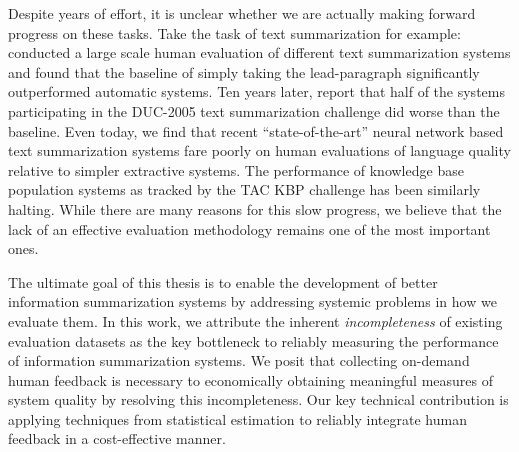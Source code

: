 Despite years of effort, it is unclear whether we are actually making forward progress on these tasks.
Take the task of text summarization for example:
\citet{brandow1995automatic} conducted a large scale human evaluation of different text summarization systems and found that the baseline of simply taking the lead-paragraph significantly outperformed automatic systems. 
Ten years later, \citet{passonneau2005applying} report that half of the systems participating in the DUC-2005 text summarization challenge did worse than the baseline.
Even today, we find that recent ``state-of-the-art'' neural network based text summarization systems fare poorly on human evaluations of language quality relative to simpler extractive systems.
The performance of knowledge base population systems as tracked by the TAC KBP challenge has been similarly halting.
While there are many reasons for this slow progress, we believe that the lack of an effective evaluation methodology remains one of the most important ones.

The ultimate goal of this thesis is to enable the development of better information summarization systems by addressing systemic problems in how we evaluate them.
In this work, we attribute the inherent \textit{incompleteness} of existing evaluation datasets as the key bottleneck to reliably measuring the performance of information summarization systems.
We posit that collecting on-demand human feedback is necessary to economically obtaining meaningful measures of system quality by resolving this incompleteness.
Our key technical contribution is applying techniques from statistical estimation to reliably integrate human feedback in a cost-effective manner.

